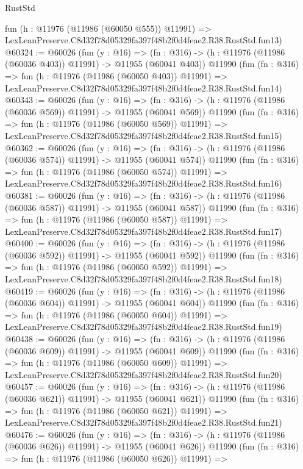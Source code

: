 \begin{lexlean}{RustStd}
\begin{coremodule}
    fun (h : @11976 (@11986 (@60050 @555)) @11991) =>
    LexLeanPreserve.C8d32f78d05329fa397f48b2f0d4feae2.R38.RustStd.fun13)
@60324 := @60026
    (fun (y : @16) =>
    (fn : @316) -> (h : @11976 (@11986 (@60036 @403)) @11991) -> @11955 (@60041 @403))
    @11990
    (fun (fn : @316) =>
    fun (h : @11976 (@11986 (@60050 @403)) @11991) =>
    LexLeanPreserve.C8d32f78d05329fa397f48b2f0d4feae2.R38.RustStd.fun14)
@60343 := @60026
    (fun (y : @16) =>
    (fn : @316) -> (h : @11976 (@11986 (@60036 @569)) @11991) -> @11955 (@60041 @569))
    @11990
    (fun (fn : @316) =>
    fun (h : @11976 (@11986 (@60050 @569)) @11991) =>
    LexLeanPreserve.C8d32f78d05329fa397f48b2f0d4feae2.R38.RustStd.fun15)
@60362 := @60026
    (fun (y : @16) =>
    (fn : @316) -> (h : @11976 (@11986 (@60036 @574)) @11991) -> @11955 (@60041 @574))
    @11990
    (fun (fn : @316) =>
    fun (h : @11976 (@11986 (@60050 @574)) @11991) =>
    LexLeanPreserve.C8d32f78d05329fa397f48b2f0d4feae2.R38.RustStd.fun16)
@60381 := @60026
    (fun (y : @16) =>
    (fn : @316) -> (h : @11976 (@11986 (@60036 @587)) @11991) -> @11955 (@60041 @587))
    @11990
    (fun (fn : @316) =>
    fun (h : @11976 (@11986 (@60050 @587)) @11991) =>
    LexLeanPreserve.C8d32f78d05329fa397f48b2f0d4feae2.R38.RustStd.fun17)
@60400 := @60026
    (fun (y : @16) =>
    (fn : @316) -> (h : @11976 (@11986 (@60036 @592)) @11991) -> @11955 (@60041 @592))
    @11990
    (fun (fn : @316) =>
    fun (h : @11976 (@11986 (@60050 @592)) @11991) =>
    LexLeanPreserve.C8d32f78d05329fa397f48b2f0d4feae2.R38.RustStd.fun18)
@60419 := @60026
    (fun (y : @16) =>
    (fn : @316) -> (h : @11976 (@11986 (@60036 @604)) @11991) -> @11955 (@60041 @604))
    @11990
    (fun (fn : @316) =>
    fun (h : @11976 (@11986 (@60050 @604)) @11991) =>
    LexLeanPreserve.C8d32f78d05329fa397f48b2f0d4feae2.R38.RustStd.fun19)
@60438 := @60026
    (fun (y : @16) =>
    (fn : @316) -> (h : @11976 (@11986 (@60036 @609)) @11991) -> @11955 (@60041 @609))
    @11990
    (fun (fn : @316) =>
    fun (h : @11976 (@11986 (@60050 @609)) @11991) =>
    LexLeanPreserve.C8d32f78d05329fa397f48b2f0d4feae2.R38.RustStd.fun20)
@60457 := @60026
    (fun (y : @16) =>
    (fn : @316) -> (h : @11976 (@11986 (@60036 @621)) @11991) -> @11955 (@60041 @621))
    @11990
    (fun (fn : @316) =>
    fun (h : @11976 (@11986 (@60050 @621)) @11991) =>
    LexLeanPreserve.C8d32f78d05329fa397f48b2f0d4feae2.R38.RustStd.fun21)
@60476 := @60026
    (fun (y : @16) =>
    (fn : @316) -> (h : @11976 (@11986 (@60036 @626)) @11991) -> @11955 (@60041 @626))
    @11990
    (fun (fn : @316) =>
    fun (h : @11976 (@11986 (@60050 @626)) @11991) =>

\end{coremodule}
\end{lexlean}
